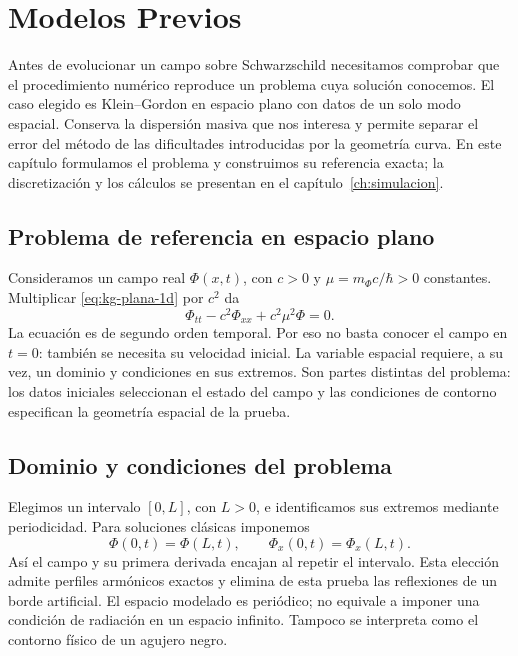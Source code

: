 \chapter{Modelos Previos}
\label{ch:modelos-previos}

Antes de evolucionar un campo sobre Schwarzschild necesitamos comprobar
que el procedimiento numérico reproduce un problema cuya solución conocemos.
El caso elegido es Klein--Gordon en espacio plano con datos de un solo modo
espacial. Conserva la dispersión masiva que nos interesa y permite separar
el error del método de las dificultades introducidas por la geometría curva.
En este capítulo formulamos el problema y construimos su referencia exacta;
la discretización y los cálculos se presentan en el
capítulo~\ref{ch:simulacion}.

\section{Problema de referencia en espacio plano}

Consideramos un campo real $\Phi(x,t)$, con $c>0$ y
$\mu=m_\Phi c/\hbar>0$ constantes. Multiplicar
\eqref{eq:kg-plana-1d} por $c^2$ da
\begin{equation}
\Phi_{tt}-c^2\Phi_{xx}+c^2\mu^2\Phi=0.
\label{eq:kg-previo}
\end{equation}
La ecuación es de segundo orden temporal. Por eso no basta conocer el campo
en $t=0$: también se necesita su velocidad inicial. La variable espacial
requiere, a su vez, un dominio y condiciones en sus extremos. Son partes
distintas del problema: los datos iniciales seleccionan el estado del campo
y las condiciones de contorno especifican la geometría espacial de la prueba.

\section{Dominio y condiciones del problema}

Elegimos un intervalo $[0,L]$, con $L>0$, e identificamos sus extremos
mediante periodicidad. Para soluciones clásicas imponemos
\begin{equation}
\Phi(0,t)=\Phi(L,t),\qquad \Phi_x(0,t)=\Phi_x(L,t).
\label{eq:contorno-periodico}
\end{equation}
Así el campo y su primera derivada encajan al repetir el intervalo. Esta
elección admite perfiles armónicos exactos y elimina de esta prueba las
reflexiones de un borde artificial. El espacio modelado es periódico;
no equivale a imponer una condición de radiación en un espacio infinito.
Tampoco se interpreta como el contorno físico de un agujero negro.

